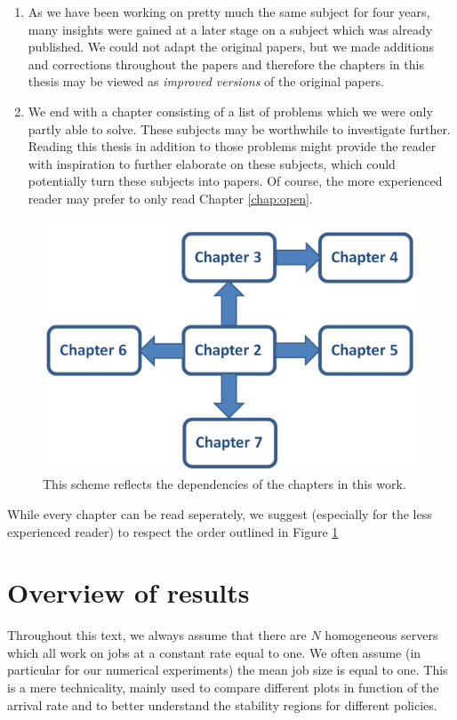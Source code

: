 \documentclass[12pt]{report}
\begin{document}
\begin{enumerate}
\item As we have been working on pretty much the same subject for four years, many insights were gained at a later stage on a subject which was already published. We could not adapt the original papers, but we made additions and corrections throughout the papers and therefore the chapters in this thesis may be viewed as \textit{improved versions} of the original papers.
\item We end with a chapter consisting of a list of problems which we were only partly able to solve. These subjects may be worthwhile to investigate further. Reading this thesis in addition to those problems might provide the reader with inspiration to further elaborate on these subjects, which could potentially turn these subjects into papers. Of course, the more experienced reader may prefer to only read Chapter \ref{chap:open}.
\end{enumerate}

\begin{figure}
	\includegraphics[scale=0.6]{figures/Chapter1/dependency_scheme.PNG}
	\caption{This scheme reflects the dependencies of the chapters in this work.} \label{fig:scheme_depedencies}
\end{figure}

While every chapter can be read seperately, we suggest (especially for the less experienced reader) to respect the order outlined in Figure \ref{fig:scheme_depedencies}

\section{Overview of results}
Throughout this text, we always assume that there are $N$ homogeneous servers which all work on jobs at a constant rate equal to one.
We often assume (in particular for our numerical experiments) the mean job size is equal to one. This is a mere technicality, mainly used to compare different plots in function of the arrival rate and to better understand the stability regions for different policies.
\end{document}
